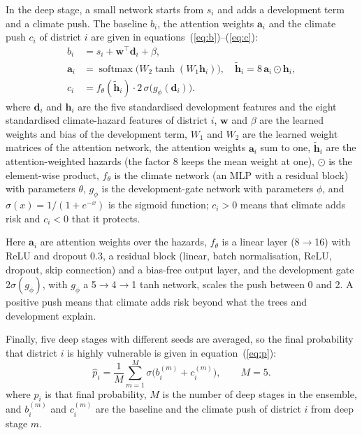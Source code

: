 \documentclass[conference]{IEEEtran}
\begin{document}
In the deep stage, a small network starts from $s_i$ and adds a development term and a climate push. The baseline $b_i$, the attention weights $\mathbf{a}_i$ and the climate push $c_i$ of district $i$ are given in equations~(\ref{eq:b})--(\ref{eq:c}):
\begin{align}
b_i &= s_i + \mathbf{w}^{\top}\mathbf{d}_i + \beta, \label{eq:b}\\
\mathbf{a}_i &= \operatorname{softmax}\!\big(W_2 \tanh(W_1 \mathbf{h}_i)\big),\quad \tilde{\mathbf{h}}_i = 8\,\mathbf{a}_i \odot \mathbf{h}_i, \\
c_i &= f_\theta(\tilde{\mathbf{h}}_i)\cdot 2\,\sigma\!\big(g_\phi(\mathbf{d}_i)\big). \label{eq:c}
\end{align}
\noindent where $\mathbf{d}_i$ and $\mathbf{h}_i$ are the five standardised development features and the eight standardised climate-hazard features of district $i$, $\mathbf{w}$ and $\beta$ are the learned weights and bias of the development term, $W_1$ and $W_2$ are the learned weight matrices of the attention network, the attention weights $\mathbf{a}_i$ sum to one, $\tilde{\mathbf{h}}_i$ are the attention-weighted hazards (the factor 8 keeps the mean weight at one), $\odot$ is the element-wise product, $f_\theta$ is the climate network (an MLP with a residual block) with parameters $\theta$, $g_\phi$ is the development-gate network with parameters $\phi$, and $\sigma(x) = 1/(1+e^{-x})$ is the sigmoid function; $c_i > 0$ means that climate adds risk and $c_i < 0$ that it protects.


Here $\mathbf{a}_i$ are attention weights over the hazards, $f_\theta$ is a linear layer (8$\rightarrow$16) with ReLU and dropout 0.3, a residual block \cite{he2016} (linear, batch normalisation, ReLU, dropout, skip connection) and a bias-free output layer, and the development gate $2\sigma(g_\phi)$, with $g_\phi$ a 5$\rightarrow$4$\rightarrow$1 tanh network, scales the push between 0 and 2. A positive push means that climate adds risk beyond what the trees and development explain.

Finally, five deep stages with different seeds are averaged, so the final probability that district $i$ is highly vulnerable is given in equation~(\ref{eq:p}):
\begin{equation}\label{eq:p}
\hat p_i = \frac{1}{M}\sum_{m=1}^{M}\sigma\big(b^{(m)}_i + c^{(m)}_i\big),\qquad M = 5.
\end{equation}
\noindent where $\hat p_i$ is that final probability, $M$ is the number of deep stages in the ensemble, and $b^{(m)}_i$ and $c^{(m)}_i$ are the baseline and the climate push of district $i$ from deep stage $m$.
\end{document}
